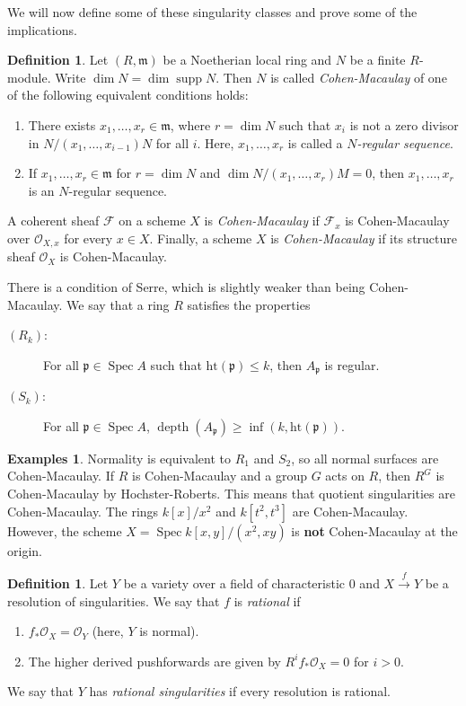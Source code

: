 \documentclass[leqno, openany]{memoir}
\theoremstyle{definition}
\newtheorem{defn}[thm]{Definition}
\newtheorem{exms}[thm]{Examples}
\theoremstyle{remark}
\theoremstyle{plain}
\theoremstyle{definition}
\theoremstyle{remark}
\newcommand{\mc}[1]{\mathcal{#1}}
\newcommand{\mf}[1]{\mathfrak{#1}}
\newcommand{\mr}[1]{\mathrm{#1}}
\DeclareMathOperator{\supp}{supp}
\DeclareMathOperator{\Spec}{Spec}
\begin{document}
We will now define some of these singularity classes and prove some of the implications.

\begin{defn}
    Let $(R, \mf{m})$ be a Noetherian local ring and $N$ be a finite $R$-module. Write $\dim N = \dim \supp N$. Then $N$ is called \textit{Cohen-Macaulay} of one of the following equivalent conditions holds:
    \begin{enumerate}
        \item There exists $x_1, \ldots, x_r \in \mf{m}$, where $r = \dim N$ such that $x_i$ is not a zero divisor in $N/(x_1, \ldots, x_{i-1})N$ for all $i$. Here, $x_1, \ldots, x_r$ is called a \textit{$N$-regular sequence}.
        \item If $x_1, \ldots, x_r \in \mf{m}$ for $r = \dim N$ and $\dim N/(x_1, \ldots, x_r)M = 0$, then $x_1, \ldots, x_r$ is an $N$-regular sequence.
    \end{enumerate}
    A coherent sheaf $\mc{F}$ on a scheme $X$ is \textit{Cohen-Macaulay} if $\mc{F}_x$ is Cohen-Macaulay over $\mc{O}_{X,x}$ for every $x \in X$. Finally, a scheme $X$ is \textit{Cohen-Macaulay} if its structure sheaf $\mc{O}_X$ is Cohen-Macaulay.
\end{defn}

There is a condition of Serre, which is slightly weaker than being Cohen-Macaulay. We say that a ring $R$ satisfies the properties
\begin{description}
    \item[$(R_k)$:] For all $\mf{p} \in \Spec A$ such that $\mr{ht}(\mf{p}) \leq k$, then $A_{\mf{p}}$ is regular.
    \item[$(S_k)$:] For all $\mf{p} \in \Spec A$, $\operatorname{depth}(A_{\mf{p}}) \geq \inf (k, \mr{ht}(\mf{p}))$.
\end{description}

\begin{exms}
    Normality is equivalent to $R_1$ and $S_2$, so all normal surfaces are Cohen-Macaulay. If $R$ is Cohen-Macaulay and a group $G$ acts on $R$, then $R^G$ is Cohen-Macaulay by Hochster-Roberts. This means that quotient singularities are Cohen-Macaulay. The rings $k[x]/x^2$ and $k[t^2, t^3]$ are Cohen-Macaulay. However, the scheme $X = \Spec k[x,y]/(x^2, xy)$ is \textbf{not} Cohen-Macaulay at the origin.
\end{exms}

\begin{defn}
    Let $Y$ be a variety over a field of characteristic $0$ and $X \xrightarrow{f} Y$ be a resolution of singularities. We say that $f$ is \textit{rational} if 
    \begin{enumerate}
        \item $f_* \mc{O}_X = \mc{O}_Y$ (here, $Y$ is normal).
        \item The higher derived pushforwards are given by $R^i f_* \mc{O}_X = 0$ for $i > 0$.
    \end{enumerate}
    We say that $Y$ has \textit{rational singularities} if every resolution is rational.
\end{defn}
\end{document}
